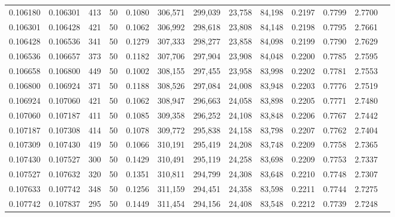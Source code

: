 \begin{tabular}{rrrrrrrrrrrrr}
0.106180 & 0.106301 &   413 &  50 &                                     0.1080 & 306,571 & 299,039 &  23,758 &  84,198 & 0.2197 & 0.7799 & 2.7700 \\
0.106301 & 0.106428 &   421 &  50 &                                     0.1062 & 306,992 & 298,618 &  23,808 &  84,148 & 0.2198 & 0.7795 & 2.7661 \\
0.106428 & 0.106536 &   341 &  50 &                                     0.1279 & 307,333 & 298,277 &  23,858 &  84,098 & 0.2199 & 0.7790 & 2.7629 \\
0.106536 & 0.106657 &   373 &  50 &                                     0.1182 & 307,706 & 297,904 &  23,908 &  84,048 & 0.2200 & 0.7785 & 2.7595 \\
0.106658 & 0.106800 &   449 &  50 &                                     0.1002 & 308,155 & 297,455 &  23,958 &  83,998 & 0.2202 & 0.7781 & 2.7553 \\
0.106800 & 0.106924 &   371 &  50 &                                     0.1188 & 308,526 & 297,084 &  24,008 &  83,948 & 0.2203 & 0.7776 & 2.7519 \\
0.106924 & 0.107060 &   421 &  50 &                                     0.1062 & 308,947 & 296,663 &  24,058 &  83,898 & 0.2205 & 0.7771 & 2.7480 \\
0.107060 & 0.107187 &   411 &  50 &                                     0.1085 & 309,358 & 296,252 &  24,108 &  83,848 & 0.2206 & 0.7767 & 2.7442 \\
0.107187 & 0.107308 &   414 &  50 &                                     0.1078 & 309,772 & 295,838 &  24,158 &  83,798 & 0.2207 & 0.7762 & 2.7404 \\
0.107309 & 0.107430 &   419 &  50 &                                     0.1066 & 310,191 & 295,419 &  24,208 &  83,748 & 0.2209 & 0.7758 & 2.7365 \\
0.107430 & 0.107527 &   300 &  50 &                                     0.1429 & 310,491 & 295,119 &  24,258 &  83,698 & 0.2209 & 0.7753 & 2.7337 \\
0.107527 & 0.107632 &   320 &  50 &                                     0.1351 & 310,811 & 294,799 &  24,308 &  83,648 & 0.2210 & 0.7748 & 2.7307 \\
0.107633 & 0.107742 &   348 &  50 &                                     0.1256 & 311,159 & 294,451 &  24,358 &  83,598 & 0.2211 & 0.7744 & 2.7275 \\
0.107742 & 0.107837 &   295 &  50 &                                     0.1449 & 311,454 & 294,156 &  24,408 &  83,548 & 0.2212 & 0.7739 & 2.7248 \\

\end{tabular}
